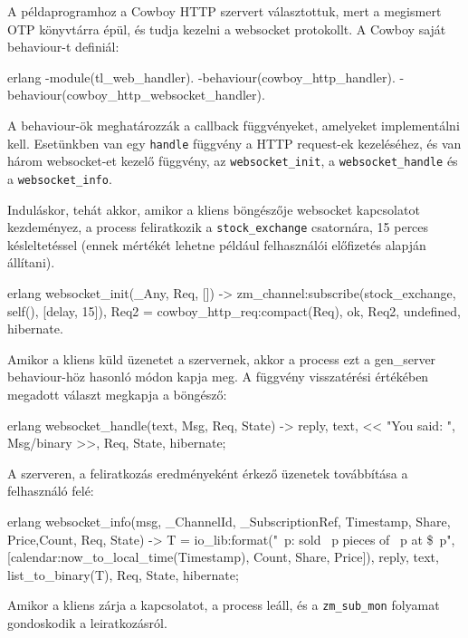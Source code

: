 \documentclass[12pt, a4paper, oneside]{book}
\begin{document}
A példaprogramhoz a Cowboy HTTP szervert választottuk, mert a megismert OTP
könyvtárra épül, és tudja kezelni a websocket protokollt. A Cowboy saját
behaviour-t definiál: 

\begin{code}{erlang}{}
-module(tl_web_handler).
-behaviour(cowboy_http_handler).
-behaviour(cowboy_http_websocket_handler).
\end{code}

A behaviour-ök meghatározzák a callback függvényeket, amelyeket implementálni
kell. Esetünkben van egy \texttt{handle} függvény a HTTP request-ek
kezeléséhez, és van három websocket-et kezelő függvény, az
\texttt{websocket\_init}, a \texttt{websocket\_handle} és a
\texttt{websocket\_info}.

Induláskor, tehát akkor, amikor a kliens böngészője websocket kapcsolatot
kezdeményez, a process feliratkozik a \texttt{stock\_exchange} csatornára, 15
perces késleltetéssel (ennek mértékét lehetne például felhasználói előfizetés
alapján állítani).

\begin{code}{erlang}{}
websocket_init(_Any, Req, []) ->
  zm_channel:subscribe(stock_exchange, self(), [{delay, 15}]),
  Req2 = cowboy_http_req:compact(Req),
  {ok, Req2, undefined, hibernate}.
\end{code}

Amikor a kliens küld üzenetet a szervernek, akkor a process ezt a gen\_server
behaviour-höz hasonló módon kapja meg. A függvény visszatérési értékében
megadott választ megkapja a böngésző:

\begin{code}{erlang}{}
websocket_handle({text, Msg}, Req, State) ->
  {reply, {text, << "You said: ", Msg/binary >>}, 
           Req, State, hibernate};
\end{code}

A szerveren, a feliratkozás eredményeként érkező üzenetek továbbítása a
felhasználó felé:

\begin{code}{erlang}{}
websocket_info({msg, {_ChannelId, _SubscriptionRef}, 
               {Timestamp, {Share, Price,Count}}}, 
                Req, State) ->
  T = io_lib:format("~p: sold ~p pieces of ~p at \$~p",
                [calendar:now_to_local_time(Timestamp), 
                Count, Share, Price]),
  {reply, {text, list_to_binary(T)}, Req, State, hibernate};
\end{code}

Amikor a kliens zárja a kapcsolatot, a process leáll, és a
\texttt{zm\_sub\_mon} folyamat gondoskodik a leiratkozásról.
\end{document}
